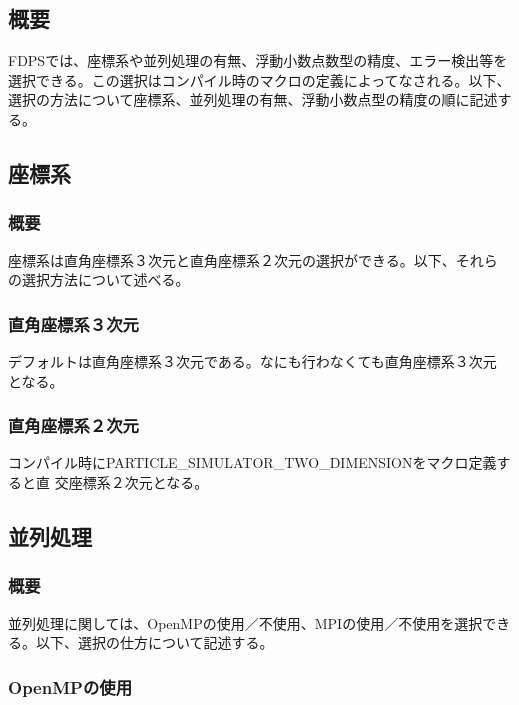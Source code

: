 \subsection{概要}

FDPSでは、座標系や並列処理の有無、浮動小数点数型の精度、エラー検出等を選択できる。この選択はコンパイル時のマクロの定義によってなされる。以下、選択の方法について座標系、並列処理の有無、浮動小数点型の精度の順に記述する。

\subsection{座標系}
\label{sec:compile_coordinate}

\subsubsection{概要}

座標系は直角座標系３次元と直角座標系２次元の選択ができる。以下、それら
の選択方法について述べる。

\subsubsection{直角座標系３次元}

デフォルトは直角座標系３次元である。なにも行わなくても直角座標系３次元
となる。

\subsubsection{直角座標系２次元}

コンパイル時にPARTICLE\_SIMULATOR\_TWO\_DIMENSIONをマクロ定義すると直
交座標系２次元となる。

\subsection{並列処理}

\subsubsection{概要}

並列処理に関しては、OpenMPの使用／不使用、MPIの使用／不使用を選択でき
る。以下、選択の仕方について記述する。

\subsubsection{OpenMPの使用}

